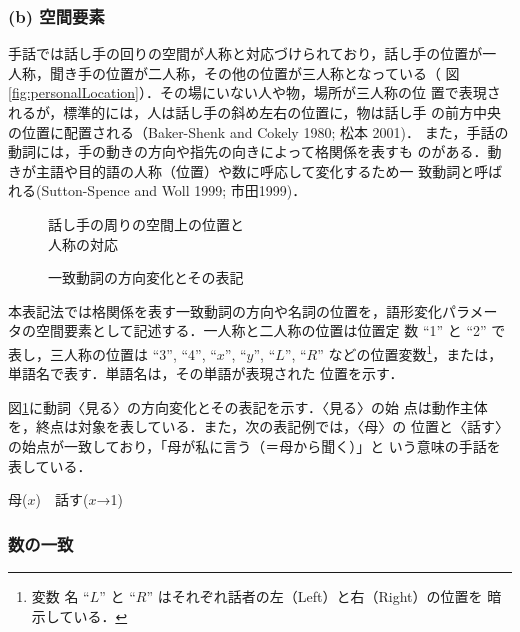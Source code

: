 \subsubsection*{(b) 空間要素}

手話では話し手の回りの空間が人称と対応づけられており，話し手の位置が一
人称，聞き手の位置が二人称，その他の位置が三人称となっている（
図\ref{fig:personalLocation}）．その場にいない人や物，場所が三人称の位
置で表現されるが，標準的には，人は話し手の斜め左右の位置に，物は話し手
の前方中央の位置に配置される（Baker-Shenk and Cokely 1980; 松本
2001)\nocite{Baker-Shenk1980}．
また，手話の動詞には，手の動きの方向や指先の向きによって格関係を表すも
のがある．動きが主語や目的語の人称（位置）や数に呼応して変化するため一
致動詞と呼ばれる(Sutton-Spence and Woll 1999; 市田1999)．
\nocite{Ichida1999}

\begin{figure}
  \begin{minipage}[t]{.47\linewidth}
    \center
    \epsfxsize=5.5cm
    \caption{話し手の周りの空間上の位置と\\人称の対応}
    \label{fig:personalLocation}
  \end{minipage}
  \hfill
  \begin{minipage}[t]{.47\linewidth}
    \center
    \epsfxsize=5.5cm
    \caption{一致動詞の方向変化とその表記}
    \label{fig:miru}
  \end{minipage}
\end{figure}

本表記法では格関係を表す一致動詞の方向や名詞の位置を，語形変化パラメー
タの空間要素として記述する．一人称と二人称の位置は位置定
数 ``1'' と ``2'' で表し，三人称の位置は ``3'', ``4'', ``$x$'',
``$y$'', ``$L$'', ``$R$'' などの位置変数\footnote{変数
  名 ``$L$'' と ``$R$'' はそれぞれ話者の左（Left）と右（Right）の位置を
  暗示している．}，または，単語名で表す．単語名は，その単語が表現された
位置を示す．

図\ref{fig:miru}に動詞〈見る〉の方向変化とその表記を示す．〈見る〉の始
点は動作主体を，終点は対象を表している．また，次の表記例では，〈母〉の
位置と〈話す〉の始点が一致しており，「母が私に言う（＝母から聞く）」と
いう意味の手話を表している．

\begin{ex}
  母($x$)　話す($x$→1)  
\end{ex}

\subsubsection*{数の一致}

